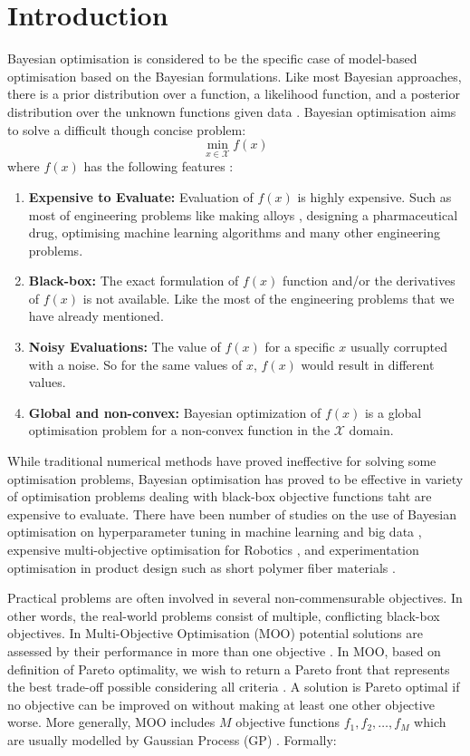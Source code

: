 \chapter{Introduction}
Bayesian optimisation is considered to be the specific case of model-based optimisation based on the Bayesian formulations. Like most Bayesian approaches, there is a prior distribution over a function, a likelihood function, and a posterior distribution over the unknown functions given data \cite{gelbart2015constrained}. Bayesian optimisation aims to solve a difficult though concise problem:
\begin{equation}
	\operatorname*{min}_{x \in \mathcal{X}} f(x)	
\label{eq:ch1_1}
\end{equation}
where $f(x)$ has the following features \cite{gelbart2015constrained}:
\begin{enumerate}
\item \textbf{Expensive to Evaluate: } Evaluation of $f(x)$ is highly expensive. Such as most of engineering problems like making alloys \cite{vellanki2017process}, designing a pharmaceutical drug, optimising machine learning algorithms \cite{snoek2012practical} and many other engineering problems.
\item \textbf{Black-box: } The exact formulation of $f(x)$ function and/or the derivatives of $f(x)$ is not available. Like the most of the engineering problems that we have already mentioned.
\item \textbf{Noisy Evaluations: } The value of $f(x)$ for a specific $x$ usually corrupted with a noise. So for the same values of $x$, $f(x)$ would result in different values.
\item \textbf{Global and non-convex: } Bayesian optimization of $f(x)$ is a global optimisation problem for a non-convex function in the $\mathcal{X}$ domain.
\end{enumerate}
While traditional numerical methods have proved ineffective for solving some optimisation problems, Bayesian optimisation has proved to be effective in variety of optimisation problems dealing with black-box objective functions taht are expensive to evaluate. There have been number of studies on the use of Bayesian optimisation on hyperparameter tuning in machine learning and big data \cite{joy2016hyperparameter}, expensive multi-objective optimisation for Robotics \cite{tesch2013expensive}, and experimentation optimisation in product design such as short polymer fiber materials \cite{li2017rapid}.
\par
Practical problems are often involved in several non-commensurable objectives. In other words, the real-world problems consist of multiple, conflicting black-box objectives. In Multi-Objective Optimisation (MOO) potential solutions are assessed  by their performance in more than one objective \cite{couckuyt2014fast}. In MOO, based on definition of Pareto optimality, we wish to return a Pareto front that represents the best trade-off  possible considering all criteria \cite{calandra2014pareto}. A solution is Pareto optimal if no objective can be improved on without making at least one other objective worse. More generally, MOO includes $M$ objective functions $f_1, f_2, \ldots, f_M$ which are usually modelled by Gaussian Process (GP) \cite{rasmussen2006gaussian}. Formally:

